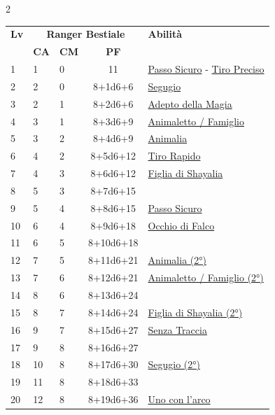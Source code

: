 {\begin{multicols}{2}


\noindent\begin{tabularx}{\linewidth}{p{0.55cm}|p{0.55cm}p{0.55cm}c|X|}
	\toprule
 \rowcolor{gray!20}	\textbf{Lv} & \multicolumn{3}{c|}{\textbf{Ranger Bestiale}} & \textbf{Abilità} \\
& \centering\arraybackslash \textbf{CA} & \centering\arraybackslash \textbf{CM} & \centering\arraybackslash \textbf{PF} & \\
	\toprule
	1 & 1 & 0 & 11 & \hyperlink{Passo Sicuro}{Passo Sicuro} - \hyperlink{Tiro Preciso}{Tiro Preciso}\\
	\rowcolor{gray!20}2 & 2 & 0 & 8+1d6+6 & \hyperlink{Segugio}{Segugio}\\
	3 & 2 & 1 & 8+2d6+6 & \hyperlink{Adepto della Magia}{Adepto della Magia}\\
	\rowcolor{gray!20}4 & 3 & 1 & 8+3d6+9 & \hyperlink{Animaletto / Famiglio}{Animaletto / Famiglio}\\
	5 & 3 & 2 & 8+4d6+9 & \hyperlink{Animalia}{Animalia}\\
	\rowcolor{gray!20}6 & 4 & 2 & 8+5d6+12 & \hyperlink{Tiro Rapido}{Tiro Rapido}\\
	7 & 4 & 3 & 8+6d6+12 & \hyperlink{Figlia di Shayalia}{Figlia di Shayalia}\\
	\rowcolor{gray!20}8 & 5 & 3 & 8+7d6+15 & \\
	9 & 5 & 4 & 8+8d6+15 & \hyperlink{Passo Sicuro}{Passo Sicuro}\\
	\rowcolor{gray!20}10 & 6 & 4 & 8+9d6+18 & \hyperlink{Occhio di Falco}{Occhio di Falco}\\
	11 & 6 & 5 & 8+10d6+18 & \\
	\rowcolor{gray!20}12 & 7 & 5 & 8+11d6+21 & \hyperlink{Animalia}{Animalia (2°)}\\
	13 & 7 & 6 & 8+12d6+21 & \hyperlink{Animaletto / Famiglio}{Animaletto / Famiglio (2°)}\\
	\rowcolor{gray!20}14 & 8 & 6 & 8+13d6+24 & \\
	15 & 8 & 7 & 8+14d6+24 & \hyperlink{Figlia di Shayalia}{Figlia di Shayalia (2°)}\\
	\rowcolor{gray!20}16 & 9 & 7 & 8+15d6+27 & \hyperlink{Senza Traccia}{Senza Traccia}\\
	17 & 9 & 8 & 8+16d6+27 & \\
	\rowcolor{gray!20}18 & 10 & 8 & 8+17d6+30 & \hyperlink{Segugio}{Segugio (2°)}\\
	19 & 11 & 8 & 8+18d6+33 & \\
	\rowcolor{gray!20}20 & 12 & 8 & 8+19d6+36 & \hyperlink{Uno con l'arco}{Uno con l'arco}\\
\end{tabularx}


\end{multicols}}
